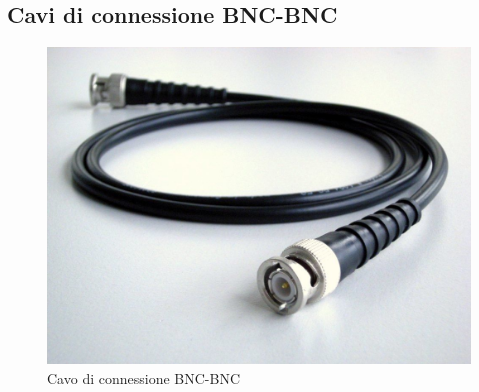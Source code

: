 \subsection*{\textbf{Cavi di connessione BNC-BNC}}
\begin{figure}[h]
    \centering
    \includegraphics[width=0.75\linewidth]{media/cavoBNC.png}
    \caption{Cavo di connessione BNC-BNC}
    \label{fig:enter-label}
\end{figure}
\FloatBarrier
\clearpage

